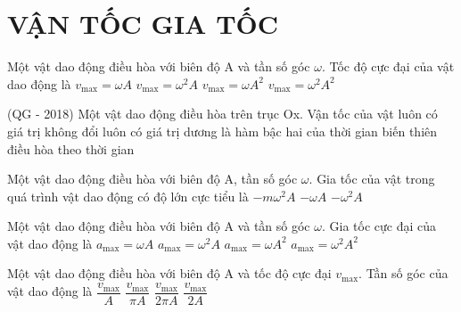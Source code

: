 \section{VẬN TỐC GIA TỐC}
\begin{ex}%
Một vật dao động điều hòa với biên độ A và tần số góc $\omega$. Tốc độ cực đại của vật dao động là
\choice
{\True $v_{\max} = \omega A$}
{$v_{\max} = \omega^2A$}
{$v_{\max} = \omega A^2$}
{$v_{\max} = \omega^2A^2$}
\end{ex} 
\begin{ex} %
(QG - 2018) Một vật dao động điều hòa trên trục Ox. Vận tốc của vật
\choice
{luôn có giá trị không đổi}
{luôn có giá trị dương}
{là hàm bậc hai của thời gian}
{\True biến thiên điều hòa theo thời gian}
\end{ex} 
\begin{ex}%
Một vật dao động điều hòa với biên độ A, tần số góc $\omega$. Gia tốc của vật trong quá trình vật dao động có độ lớn cực tiểu là
\choice
{}
{$-m\omega^2A$}
{$- \omega A$}
{$-\omega^2A$}
\end{ex} 
\begin{ex}%
Một vật dao động điều hòa với biên độ A và tần số góc $\omega$. Gia tốc cực đại của vật dao động là
\choice
{$a_{\max} = \omega A$}
{\True $a_{\max} = \omega^2A$}
{$a_{\max} = \omega A^2$}
{$a_{\max} = \omega^2A^2$}
\end{ex} 
\begin{ex}%
Một vật dao động điều hòa với biên độ A và tốc độ cực đại $v_{\max}$. Tần số góc của vật dao động là
\choice
{\True $\dfrac{v_{\max}}{A}$}
{$\dfrac{v_{\max}}{\pi A}$}
{$\dfrac{v_{\max}}{2\pi A}$}
{$\dfrac{v_{\max}}{2A}$}
\end{ex} 


